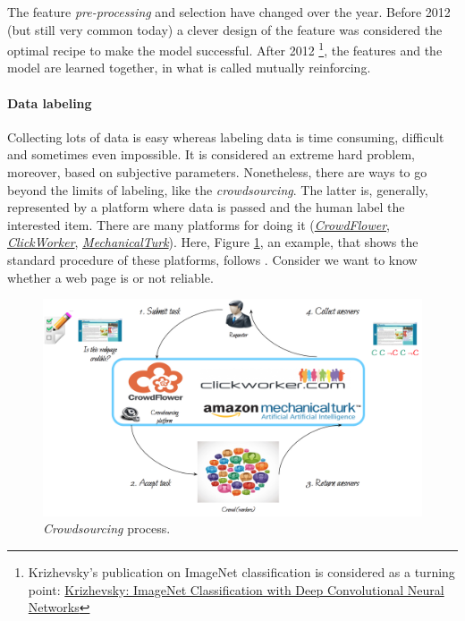 The feature \emph{pre-processing} and selection have changed over the year. Before 2012 (but still very common today) a clever design of the feature was considered the optimal recipe to make the model successful. After 2012 \footnote{Krizhevsky's publication on ImageNet classification is considered as a turning point: \href{https://papers.nips.cc/paper/4824-imagenet-classification-with-deep-convolutional-neural-networks.pdf}{Krizhevsky: ImageNet Classification with Deep Convolutional Neural Networks}}, 
the features and the model are learned together, in what is called mutually reinforcing.

\paragraph{Data labeling}

Collecting lots of data is easy whereas labeling data is time consuming, difficult and sometimes even impossible. It is considered an extreme hard problem, moreover, based on subjective parameters. Nonetheless, there are ways to go beyond the limits of labeling, like the \emph{crowdsourcing}. The latter is, generally, represented by a platform where data is passed and the human label the interested item. There are many platforms for doing it (\href{https://en.wikipedia.org/wiki/CrowdFlower}{\emph{CrowdFlower}}, \href{https://www.clickworker.com}{\emph{ClickWorker}}, \href{https://en.wikipedia.org/wiki/Amazon_Mechanical_Turk}{\emph{MechanicalTurk}}).  Here, Figure \ref{pic:crowdsourcing}, an example, that shows the standard procedure of these platforms, follows . Consider we want to know whether a web page is or not reliable.  

\begin{figure}[H]%
 \centering
 \includegraphics[width=13cm]{./img/08/crowdsourcing}
 \caption{\label{pic:crowdsourcing} \emph{Crowdsourcing} process.}
\end{figure}

